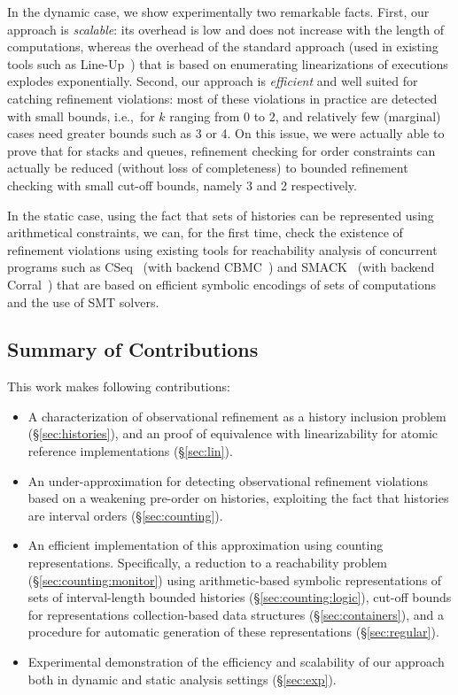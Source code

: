 In the dynamic case, we show experimentally two remarkable facts. First, our
approach is \emph{scalable}: its overhead is low and does not increase with the
length of computations, whereas the overhead of the standard approach (used in
existing tools such as Line-Up~\cite{conf/pldi/BurckhardtDMT10}) that is based
on enumerating linearizations of executions explodes exponentially. Second, our
approach is \emph{efficient} and well suited for catching refinement
violations: most of these violations in practice are detected with small
bounds, i.e.,~for $k$ ranging from 0 to $2$, and relatively few (marginal)
cases need greater bounds such as 3 or 4. On this issue, we were actually able
to prove that for stacks and queues, refinement checking for order constraints
can actually be reduced (without loss of completeness) to bounded refinement
checking with small cut-off bounds, namely 3 and 2 respectively.

In the static case, using the fact that sets of histories can be represented
using arithmetical constraints, we can, for the first time, check the existence
of refinement violations using existing tools for reachability analysis of
concurrent programs such as CSeq~\cite{conf/ase/FischerIP13} (with backend
CBMC~\cite{conf/tacas/KroeningT14}) and SMACK~\cite{conf/cav/RakamaricE14}
(with backend Corral~\cite{conf/cav/LalQL12}) that are based on efficient
symbolic encodings of sets of computations and the use of SMT solvers.

\subsection{Summary of Contributions}

This work makes following contributions:
\begin{itemize}

  \item A characterization of observational refinement as a history inclusion
  problem (\S\ref{sec:histories}), and an proof of equivalence with
  linearizability for atomic reference implementations (\S\ref{sec:lin}).

  \item An under-approximation for detecting observational refinement
  violations based on a weakening pre-order on histories, exploiting the fact
  that histories are interval orders (\S\ref{sec:counting}).

  \item An efficient implementation of this approximation using counting
  representations. Specifically, a reduction to a reachability problem
  (\S\ref{sec:counting:monitor}) using arithmetic-based symbolic
  representations of sets of interval-length bounded histories
  (\S\ref{sec:counting:logic}), cut-off bounds for representations
  collection-based data structures (\S\ref{sec:containers}), and a procedure
  for automatic generation of these representations (\S\ref{sec:regular}).

  \item Experimental demonstration of the efficiency and scalability of our
  approach both in dynamic and static analysis settings (\S\ref{sec:exp}).

\end{itemize}
